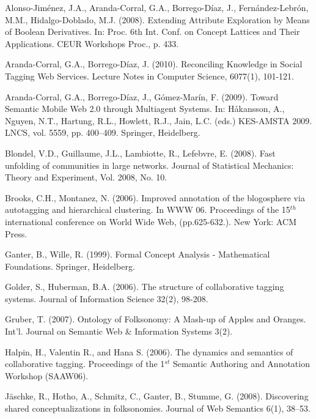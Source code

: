 \begin{thebibliography}{99}


 Alonso-Jiménez, J.A., Aranda-Corral, G.A., Borrego-Díaz, J., Fernández-Lebrón,
M.M., Hidalgo-Doblado, M.J. (2008). Extending Attribute Exploration by Means of Boolean Derivatives. In: Proc. 6th Int. Conf. on Concept Lattices and Their Applications. CEUR Workshops Proc., p. 433. 

 Aranda-Corral, G.A., Borrego-Díaz, J. (2010). Reconciling Knowledge in Social Tagging Web Services. Lecture Notes in Computer Science, 6077(1), 101-121.

 Aranda-Corral, G.A., Borrego-Díaz, J., Gómez-Marín, F. (2009). Toward Semantic Mobile Web 2.0 through Multiagent Systems. In: Håkansson, A., Nguyen, N.T., Hartung, 
R.L., Howlett, R.J., Jain, L.C. (eds.) KES-AMSTA 2009. LNCS, vol. 5559, pp. 400–409. Springer, Heidelberg.

 Blondel, V.D., Guillaume, J.L., Lambiotte, R., Lefebvre, E. (2008). Fast unfolding of communities in large networks. Journal of Statistical Mechanics: Theory and Experiment, Vol. 2008, No. 10.

 Brooks, C.H., Montanez, N. (2006). Improved annotation of the blogosphere via autotagging and hierarchical clustering. In WWW 06. Proceedings of the 15$^{th}$ international conference on World Wide Web, (pp.625-632.). New York: ACM Press.  

 Ganter, B., Wille, R. (1999). Formal Concept Analysis - Mathematical Foundations. Springer, Heidelberg.

 Golder, S., Huberman, B.A. (2006). The structure of collaborative tagging systems. Journal of Information Science 32(2), 98-208.

 Gruber, T. (2007). Ontology of Folksonomy: A Mash-up of Apples and Oranges. Int'l. Journal on Semantic Web \& Information Systems 3(2).

 Halpin, H., Valentin R., and Hana S. (2006). The dynamics and semantics of collaborative tagging. Proceedings of the 1$^{st}$ Semantic Authoring and Annotation Workshop (SAAW06). 

 Jäschke, R., Hotho, A., Schmitz, C., Ganter, B., Stumme, G. (2008). Discovering shared conceptualizations in folksonomies. Journal of Web Semantics 6(1), 38–53.


\end{thebibliography}
